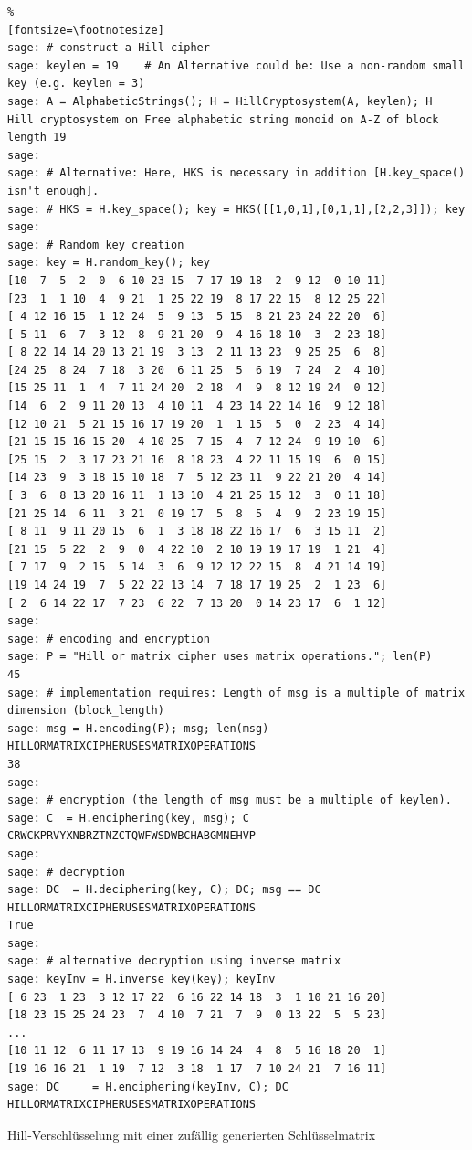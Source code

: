 \begin{refsegment}
\begin{sagecode}
\begin{Verbatim}%
[fontsize=\footnotesize]
sage: # construct a Hill cipher
sage: keylen = 19    # An Alternative could be: Use a non-random small key (e.g. keylen = 3)
sage: A = AlphabeticStrings(); H = HillCryptosystem(A, keylen); H
Hill cryptosystem on Free alphabetic string monoid on A-Z of block length 19
sage:
sage: # Alternative: Here, HKS is necessary in addition [H.key_space() isn't enough].
sage: # HKS = H.key_space(); key = HKS([[1,0,1],[0,1,1],[2,2,3]]); key
sage:
sage: # Random key creation
sage: key = H.random_key(); key
[10  7  5  2  0  6 10 23 15  7 17 19 18  2  9 12  0 10 11]
[23  1  1 10  4  9 21  1 25 22 19  8 17 22 15  8 12 25 22]
[ 4 12 16 15  1 12 24  5  9 13  5 15  8 21 23 24 22 20  6]
[ 5 11  6  7  3 12  8  9 21 20  9  4 16 18 10  3  2 23 18]
[ 8 22 14 14 20 13 21 19  3 13  2 11 13 23  9 25 25  6  8]
[24 25  8 24  7 18  3 20  6 11 25  5  6 19  7 24  2  4 10]
[15 25 11  1  4  7 11 24 20  2 18  4  9  8 12 19 24  0 12]
[14  6  2  9 11 20 13  4 10 11  4 23 14 22 14 16  9 12 18]
[12 10 21  5 21 15 16 17 19 20  1  1 15  5  0  2 23  4 14]
[21 15 15 16 15 20  4 10 25  7 15  4  7 12 24  9 19 10  6]
[25 15  2  3 17 23 21 16  8 18 23  4 22 11 15 19  6  0 15]
[14 23  9  3 18 15 10 18  7  5 12 23 11  9 22 21 20  4 14]
[ 3  6  8 13 20 16 11  1 13 10  4 21 25 15 12  3  0 11 18]
[21 25 14  6 11  3 21  0 19 17  5  8  5  4  9  2 23 19 15]
[ 8 11  9 11 20 15  6  1  3 18 18 22 16 17  6  3 15 11  2]
[21 15  5 22  2  9  0  4 22 10  2 10 19 19 17 19  1 21  4]
[ 7 17  9  2 15  5 14  3  6  9 12 12 22 15  8  4 21 14 19]
[19 14 24 19  7  5 22 22 13 14  7 18 17 19 25  2  1 23  6]
[ 2  6 14 22 17  7 23  6 22  7 13 20  0 14 23 17  6  1 12]
sage:
sage: # encoding and encryption
sage: P = "Hill or matrix cipher uses matrix operations."; len(P)
45
sage: # implementation requires: Length of msg is a multiple of matrix dimension (block_length)
sage: msg = H.encoding(P); msg; len(msg)
HILLORMATRIXCIPHERUSESMATRIXOPERATIONS
38
sage:
sage: # encryption (the length of msg must be a multiple of keylen).
sage: C  = H.enciphering(key, msg); C
CRWCKPRVYXNBRZTNZCTQWFWSDWBCHABGMNEHVP
sage:
sage: # decryption
sage: DC  = H.deciphering(key, C); DC; msg == DC
HILLORMATRIXCIPHERUSESMATRIXOPERATIONS
True
sage:
sage: # alternative decryption using inverse matrix
sage: keyInv = H.inverse_key(key); keyInv
[ 6 23  1 23  3 12 17 22  6 16 22 14 18  3  1 10 21 16 20]
[18 23 15 25 24 23  7  4 10  7 21  7  9  0 13 22  5  5 23]
...
[10 11 12  6 11 17 13  9 19 16 14 24  4  8  5 16 18 20  1]
[19 16 16 21  1 19  7 12  3 18  1 17  7 10 24 21  7 16 11]
sage: DC     = H.enciphering(keyInv, C); DC
HILLORMATRIXCIPHERUSESMATRIXOPERATIONS
\end{Verbatim}
\caption{Hill-Verschlüsselung mit einer zufällig generierten Schlüsselmatrix}
\end{sagecode}


\end{refsegment}

